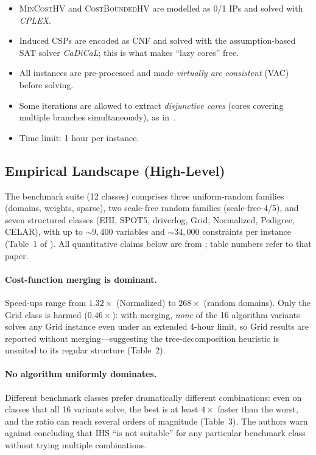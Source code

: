\begin{itemize}
\item \textsc{MinCostHV} and \textsc{CostBoundedHV} are modelled as 0/1 IPs
and solved with \emph{CPLEX}.
\item Induced CSPs are encoded as CNF and solved with the assumption-based
SAT solver \emph{CaDiCaL}; this is what makes ``lazy cores'' free.
\item All instances are pre-processed and made \emph{virtually arc consistent}
(VAC) before solving.
\item Some iterations are allowed to extract \emph{disjunctive cores} (cores
covering multiple branches simultaneously), as in~\citet{allouche2015anytime}.
\item Time limit: 1 hour per instance.
\end{itemize}

\subsection{Empirical Landscape (High-Level)}
\label{sec:wcspresults}

The benchmark suite (12 classes) comprises three uniform-random families
(domains, weights, sparse), two scale-free random families
(scale-free-4/5), and seven structured classes (EHI, SPOT5, driverlog, Grid,
Normalized, Pedigree, CELAR), with up to ${\sim}9{,}400$ variables and
${\sim}34{,}000$ constraints per instance (Table~1 of
\citealp{petrova2025empirical}). All quantitative claims below are from
\citet{petrova2025empirical}; table numbers refer to that paper.

\paragraph{Cost-function merging is dominant.} Speed-ups range from
$1.32\times$ (Normalized) to $268\times$ (random domains). Only the Grid
class is harmed ($0.46\times$): with merging, \emph{none} of the 16 algorithm
variants solves any Grid instance even under an extended 4-hour limit, so
Grid results are reported without merging---suggesting the tree-decomposition
heuristic is unsuited to its regular structure (Table~2).

\paragraph{No algorithm uniformly dominates.} Different benchmark classes
prefer dramatically different combinations: even on classes that all 16
variants solve, the best is at least $4\times$ faster than the worst, and the
ratio can reach several orders of magnitude (Table~3). The authors warn
against concluding that IHS ``is not suitable'' for any particular benchmark
class without trying multiple combinations.

